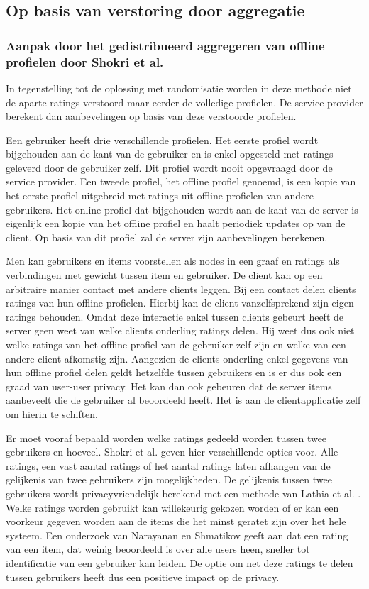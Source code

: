 
\subsection{Op basis van verstoring door aggregatie}

\subsubsection{Aanpak door het gedistribueerd aggregeren van offline profielen door Shokri et al. \cite{LCA-CONF-2009-014}}

In tegenstelling tot de oplossing met randomisatie worden in deze methode niet de aparte ratings verstoord maar eerder de volledige profielen. De service provider berekent dan aanbevelingen op basis van deze verstoorde profielen. 

Een gebruiker heeft drie verschillende profielen. Het eerste profiel wordt bijgehouden aan de kant van de gebruiker en is enkel opgesteld met ratings geleverd door de gebruiker zelf. Dit profiel wordt nooit opgevraagd door de service provider. Een tweede profiel, het offline profiel genoemd, is een kopie van het eerste profiel uitgebreid met ratings uit offline profielen van andere gebruikers. Het online profiel dat bijgehouden wordt aan de kant van de server is eigenlijk een kopie van het offline profiel en haalt periodiek updates op van de client. Op basis van dit profiel zal de server zijn aanbevelingen berekenen.

Men kan gebruikers en items voorstellen als nodes in een graaf en ratings als verbindingen met gewicht tussen item en gebruiker. De client kan op een arbitraire manier contact met andere clients leggen. Bij een contact delen clients ratings van hun offline profielen. Hierbij kan de client vanzelfsprekend zijn eigen ratings behouden. Omdat deze interactie enkel tussen clients gebeurt heeft de server geen weet van welke clients onderling ratings delen. Hij weet dus ook niet welke ratings van het offline profiel van de gebruiker zelf  zijn en welke van een andere client afkomstig zijn.  Aangezien de clients onderling enkel gegevens van hun offline profiel delen geldt hetzelfde tussen gebruikers en is er dus ook een graad van user-user privacy. Het kan dan ook gebeuren dat de server items aanbeveelt die de gebruiker al beoordeeld heeft. Het is aan de clientapplicatie zelf om hierin te schiften. 

Er moet vooraf bepaald worden welke ratings gedeeld worden tussen twee gebruikers en hoeveel. Shokri et al. geven hier verschillende opties voor. Alle ratings, een vast aantal ratings of het aantal ratings laten afhangen van de gelijkenis van twee gebruikers zijn mogelijkheden. De gelijkenis tussen twee gebruikers wordt privacyvriendelijk berekend met een methode van Lathia et al. \cite{lath}. Welke ratings worden gebruikt kan willekeurig gekozen worden of er kan een voorkeur gegeven worden aan de items die het minst geratet zijn over het hele systeem. Een onderzoek van Narayanan en Shmatikov \cite{nar} geeft aan dat een rating van een item, dat weinig beoordeeld is over alle users heen, sneller tot identificatie van een gebruiker kan leiden.  De optie om net deze ratings te delen tussen gebruikers heeft dus een positieve impact op de privacy.

